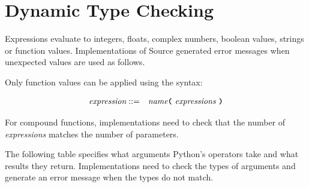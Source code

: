\section{Dynamic Type Checking}

Expressions evaluate to integers, floats, complex numbers, boolean
values, strings or function values. Implementations of Source
generated error messages when unexpected values are used as follows.

Only function values can be applied using the syntax:

\begin{eqnarray*}
  \textit{expression}
  & ::=   &  \textit{name}
  \texttt{\textbf{(}}\  \textit{expressions} \
  \texttt{\textbf{)}}\\
\end{eqnarray*}

For compound functions, implementations need to check that the number
of \textit{expressions} matches the number of parameters.

The following table specifies what arguments Python's operators take
and what results they return. Implementations need to check the types
of arguments and generate an error message when the types do not match.

